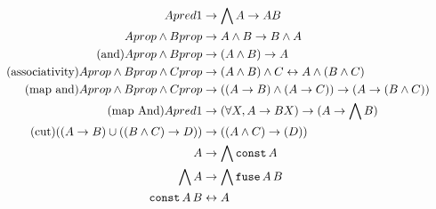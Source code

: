 \documentclass{article}
\begin{document}
  \begin{align*}
    A pred1 &\to \bigwedge A \to AB\\
    A prop \wedge B prop &\to A \wedge B \to B \wedge A\\
    \tag{and}
    A prop \wedge B prop &\to (A \wedge B) \to A\\
    \tag{associativity}
    A prop \wedge B prop \wedge C prop &\to (A \wedge B) \wedge C \leftrightarrow A \wedge (B \wedge C)\\
    \tag{map and}
    A prop \wedge B prop \wedge C prop &\to ((A \to B) \wedge (A \to C)) \to (A \to (B \wedge C))\\
    \tag{map And}
    A pred1 &\to (\forall X, A \to B X) \to (A \to \bigwedge B)\\
    \tag{cut}
    ((A \to B) \cup ((B \wedge C) \to D)) &\to ((A \wedge C) \to (D))\\
    A &\to \bigwedge \operatorname{\texttt{const}} A\\
    \bigwedge A &\to \bigwedge \operatorname{\texttt{fuse}} A\,B\\
    \operatorname{\texttt{const}} A\,B &\leftrightarrow A
  \end{align*}
\end{document}
